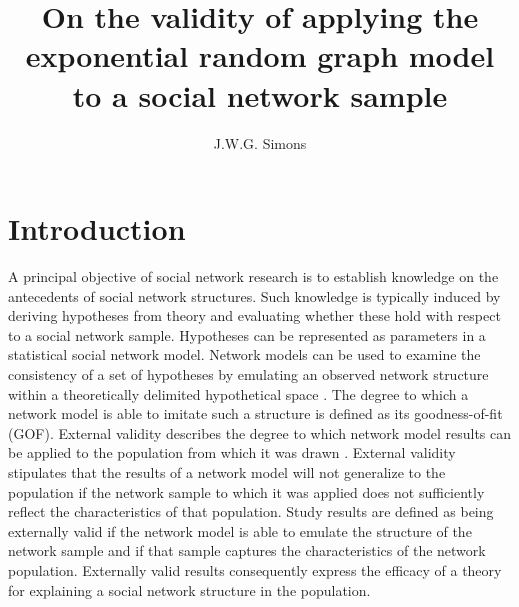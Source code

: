 \documentclass[a4paper, man, floatsintext]{apa6}
\title{On the validity of applying the exponential random graph model to a social network sample}
\author{J.W.G. Simons}
\affiliation{Utrecht University}
\begin{document}
\maketitle

\section{Introduction}
A principal objective of social network research is to establish knowledge on the antecedents of social network structures. Such knowledge is typically induced by deriving hypotheses from theory and evaluating whether these hold with respect to a social network sample. Hypotheses can be represented as parameters in a statistical social network model. Network models can be used to examine the consistency of a set of hypotheses by emulating an observed network structure within a theoretically delimited hypothetical space \cite{cox2006principles}. The degree to which a network model is able to imitate such a structure is defined as its goodness-of-fit (GOF). External validity describes the degree to which network model results can be applied to the population from which it was drawn \cite{crano2014principles}. External validity stipulates that the results of a network model will not generalize to the population if the network sample to which it was applied does not sufficiently reflect the characteristics of that population. Study results are defined as being externally valid if the network model is able to emulate the structure of the network sample and if that sample captures the characteristics of the network population. Externally valid results consequently express the efficacy of a theory for explaining a social network structure in the population.
\\
\end{document}
